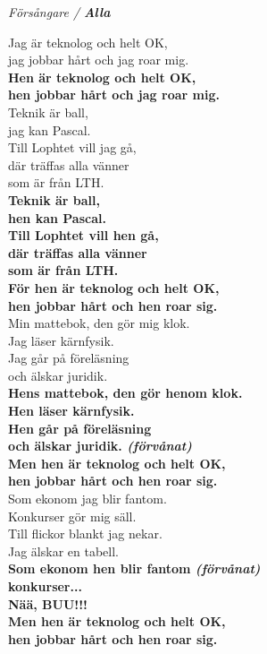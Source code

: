 \documentclass[a6paper,10pt]{article}
\begin{document}
\setlength{\oddsidemargin}{-0.37in}
\noindent
\begin{center}
\textit{Försångare / \textbf{Alla}}
\end{center}
\begin{lyrics}
Jag är teknolog och helt OK,\\
jag jobbar hårt och jag roar mig.\\
\textbf{Hen är teknolog och helt OK,\\
hen jobbar hårt och jag roar mig.}
\vspace{5pt}\\
Teknik är ball,\\
jag kan Pascal.\\
Till Lophtet vill jag gå,\\
där träffas alla vänner\\
som är från LTH.
\vspace{5pt}\\
\textbf{Teknik är ball,\\
hen kan Pascal.\\
Till Lophtet vill hen gå,\\
där träffas alla vänner\\
som är från LTH.
\vspace{5pt}\\
För hen är teknolog och helt OK,\\
hen jobbar hårt och hen roar sig.}
\vspace{5pt}\\
Min mattebok, den gör mig klok.\\
Jag läser kärnfysik.\\
Jag går på föreläsning\\
och älskar juridik.
\vspace{5pt}\\
\textbf{Hens mattebok, den gör henom klok.\\
Hen läser kärnfysik.\\
Hen går på föreläsning\\
och älskar juridik. \textit{(förvånat)}
\vspace{5pt}\\
Men hen är teknolog och helt OK,\\
hen jobbar hårt och hen roar sig.}
\vspace{5pt}\\

\newpage
\setlength{\oddsidemargin}{-0.47in}
\noindent
Som ekonom jag blir fantom.\\
Konkurser gör mig säll.\\
Till flickor blankt jag nekar.\\
Jag älskar en tabell.
\vspace{5pt}\\
\textbf{Som ekonom hen blir fantom \textit{(förvånat)}\\
konkurser...\\
Nää, BUU!!!
\vspace{5pt}\\
Men hen är teknolog och helt OK,\\
hen jobbar hårt och hen roar sig.}
\end{lyrics}
\end{document}
